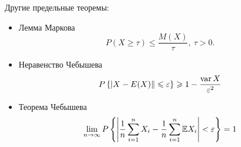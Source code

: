 \par 
Другие предельные теоремы:
\begin{itemize}
    \item Лемма Маркова  
    \[
        P(X\geq \tau) \leq \dfrac{M(X)}{\tau}, \ \tau > 0.
    \]
    \item Неравенство Чебышева
    \[
        P\left\{\left|X - E(X)\right\| \leqslant \varepsilon\right\} \geqslant 1 - \dfrac{\operatorname{var} X}{\varepsilon^2}  
    \]
    \item Теорема Чебышева 
    \[
        \lim\limits_{n\to \infty} P\left\{\left|\dfrac{1}{n} \sum\limits_{i=1}^n X_i - \dfrac{1}{n}\sum\limits_{i=1}^{n} \mathbb{E} X_i\right| < \varepsilon\right\} = 1  
    \]
\end{itemize}